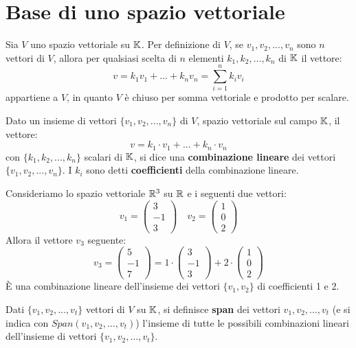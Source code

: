 \section{Base di uno spazio vettoriale}
Sia $V$ uno spazio vettoriale su $\mathbb{K}$. Per definizione di $V$, se $v_1, v_2, ..., v_n$ sono $n$ vettori
di $V$, allora per qualsiasi scelta di $n$ elementi $k_1, k_2, ..., k_n$ di $\mathbb{K}$ il vettore:
\[ v = k_1 v_1 + ... + k_n v_n = \sum_{i=1}^n k_i v_i \]
appartiene a $V$, in quanto $V$ è chiuso per somma vettoriale e prodotto per scalare.

\begin{definition}
	Dato un insieme di vettori $\{v_1, v_2, ..., v_n\}$ di $V$, spazio vettoriale sul campo $\mathbb{K}$, il
	vettore:
	\[ v = k_1 \cdot v_1 + ... + k_n \cdot v_n \]
	con $\{k_1, k_2, ..., k_n\}$ scalari di $\mathbb{K}$, si dice una \textbf{combinazione lineare} dei vettori
	$\{v_1, v_2, ..., v_n\}$. I $k_i$ sono detti \textbf{coefficienti} della combinazione lineare.
\end{definition}

\begin{example}
	Consideriamo lo spazio vettoriale $\mathbb{R}^3$ su $\mathbb{R}$ e i seguenti due vettori:
	\[
		v_1 = \begin{pmatrix}
			3 \\ -1 \\ 3
		\end{pmatrix}
		\quad
		v_2 = \begin{pmatrix}
			1 \\ 0 \\ 2
		\end{pmatrix}
	\]
	Allora il vettore $v_3$ seguente:
	\[
		v_3 = \begin{pmatrix}
			5 \\ -1 \\ 7
		\end{pmatrix}
		= 1 \cdot \begin{pmatrix}
			3 \\ -1 \\ 3
		\end{pmatrix}
		+ 2 \cdot \begin{pmatrix}
			1 \\ 0 \\ 2
		\end{pmatrix}
	\]
	È una combinazione lineare dell'insieme dei vettori $\{v_1, v_2\}$ di coefficienti 1 e 2.
\end{example}

\begin{definition}
	Dati $\{v_1, v_2, ..., v_t\}$ vettori di $V$ su $\mathbb{K}$, si definisce \textbf{span} dei vettori
	$v_1, v_2, ..., v_t$ (e si indica con $Span(v_1, v_2, \dots, v_t)$) l'insieme di tutte le possibili
	combinazioni lineari dell'insieme di vettori $\{v_1, v_2, \dots, v_t\}$.
\end{definition}

